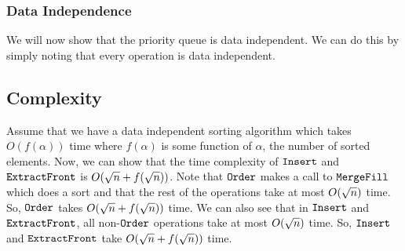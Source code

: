 \subsubsection*{Data Independence}
We will now show that the priority queue is data independent.
We can do this by simply noting that every operation is data independent.

\subsection{Complexity}
Assume that we have a data independent sorting algorithm which takes $O(f(\alpha))$ time where $f(\alpha)$ is some function of $\alpha$, the number of sorted elements.
Now, we can show that the time complexity of $\texttt{Insert}$ and $\texttt{ExtractFront}$ is $O({\sqrt{n}} + f({\sqrt{n}}))$.
Note that $\texttt{Order}$ makes a call to $\texttt{MergeFill}$ which does a sort and that the rest of the operations take at most $O({\sqrt{n}})$ time.
So, $\texttt{Order}$ takes $O({\sqrt{n}} + f({\sqrt{n}}))$ time.
We can also see that in $\texttt{Insert}$ and $\texttt{ExtractFront}$, all non-$\texttt{Order}$ operations take at most $O({\sqrt{n}})$ time.
So, $\texttt{Insert}$ and $\texttt{ExtractFront}$ take $O({\sqrt{n}} + f({\sqrt{n}}))$ time.
